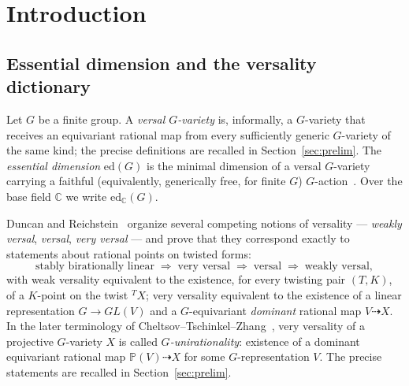 \documentclass[11pt]{article}
\theoremstyle{plain}
\theoremstyle{definition}
\theoremstyle{remark}
\newcommand{\edC}{\mathrm{ed}_{\mathbb C}}
\newcommand{\PP}{\mathbb P}
\newcommand{\dashto}{\dashrightarrow}
\begin{document}
\section{Introduction}

\subsection{Essential dimension and the versality dictionary}

Let $G$ be a finite group. A \emph{versal $G$-variety} is, informally, a
$G$-variety that receives an equivariant rational map from every
sufficiently generic $G$-variety of the same kind; the precise
definitions are recalled in Section~\ref{sec:prelim}. The
\emph{essential dimension} $\mathrm{ed}(G)$ is the minimal dimension of
a versal $G$-variety carrying a faithful (equivalently, generically
free, for finite $G$) $G$-action~\cite{DR}. Over the base field
$\mathbb C$ we write $\edC(G)$.

Duncan and Reichstein~\cite{DR} organize several competing notions of
versality --- \emph{weakly versal}, \emph{versal}, \emph{very versal}
--- and prove that they correspond exactly to statements about rational
points on twisted forms:
\[
\text{stably birationally linear} \;\Longrightarrow\; \text{very versal}
\;\Longrightarrow\; \text{versal} \;\Longrightarrow\; \text{weakly
versal},
\]
with weak versality equivalent to the existence, for every twisting pair
$(T,K)$, of a $K$-point on the twist ${}^TX$; very versality equivalent
to the existence of a linear representation $G\to GL(V)$ and a
$G$-equivariant \emph{dominant} rational map $V\dashto X$. In the later
terminology of Cheltsov--Tschinkel--Zhang~\cite{CTZ}, very versality of
a projective $G$-variety $X$ is called \emph{$G$-unirationality}:
existence of a dominant equivariant rational map $\PP(V)\dashto X$ for
some $G$-representation $V$. The precise statements are recalled in
Section~\ref{sec:prelim}.
\end{document}
